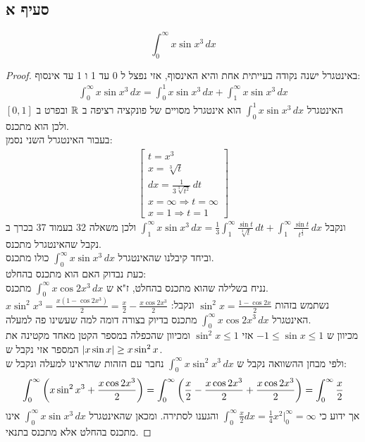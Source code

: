 \documentclass{article}
\begin{document}
	\subsection*{סעיף א}
	\[
	\int_0^\infty x \sin x^3 \, dx
	\]
	\begin{proof}
		באינטגרל ישנה נקודה בעייתית אחת והיא האינסוף, אזי נפצל ל 0 עד 1 ו 1 עד אינסוף:
		\begin{align*}
			\int_0^\infty x \sin x^3 \, dx = \int_0^1 x \sin x^3 \, dx + \int_1^\infty x \sin x^3 \, dx
		\end{align*}
		האינטגרל $\int_0^1 x \sin x^3 \, dx$ הוא אינטגרל מסויים של פונקציה רציפה ב $\mathbb{R}$ ובפרט ב $[0,1]$ ולכן הוא מתכנס. \\
		בעבור האינטגרל השני נסמן:
		\begin{align*}
		\begin{bmatrix}
			t = x^3 \\
			x = \sqrt[3]{t} \\
			dx = \frac{1}{3 \sqrt[3]{t^2}} \, dt \\
			x = \infty \Rightarrow t = \infty \\
			x = 1 \Rightarrow t = 1
		\end{bmatrix}
	\end{align*}
	ונקבל $\int_1^\infty x \sin x^3 \, dx =
	\frac{1}{3} \int_1^\infty \frac{\sin t}{\sqrt[3]{t}} \, dt +
	\int_1^\infty \frac{\sin t}{t^{\frac{1}{3}}}\, dx$
		ולכן משאלה 32 בעמוד 37 בכרך ב נקבל שהאינטגרל מתכנס. \\
		וביחד קיבלנו שהאינטגרל $\int_0^\infty x \sin x^3 \, dx$ כולו מתכנס. \\
		כעת נבדוק האם הוא מתכנס בהחלט: \\
		נניח בשלילה שהוא מתכנס בהחלט, ז"א ש $\int_0^\infty x \cos 2x^3 \, dx$ מתכנס. \\
		נשתמש בזהות $\sin^2 x = \frac{1 - \cos 2x}{2}$ ונקבל: $x \sin^2 x^3 = \frac{x(1 - \cos 2x^3)}{2}= \frac{x}{2} - \frac{x \cos 2x^3}{2}$
		האינטגרל $\int_0^\infty x \cos 2x^3 \, dx$ מתכנס בדיוק בצורה דומה למה שעשינו פה למעלה. \\
		מכיוון ש $-1 \leq \sin x \leq 1$ אזי $\sin^2 x \leq 1$ ומכיוון שהכפלה במספר הקטן מאחד מקטינה את המספר אזי נקבל ש $\left| x \sin x \right| \geq x \sin^2 x$. \\
		ולפי מבחן ההשוואה נקבל ש $\int_0^\infty x \sin^2 x^3 \, dx$ נחבר עם הזהות שהראינו למעלה ונקבל ש:
		\[
		\int_0^\infty \left( x \sin^2 x^3 + \frac{x \cos 2x^3}{2} \right) =
		\int_0^\infty \left( \frac{x}{2} - \frac{x \cos 2x^3}{2} + \frac{x \cos 2x^3}{2} \right) =
		\int_0^\infty \frac{x}{2}
		\]
		אך ידוע כי $\int_0^\infty \frac{x}{2} dx = \frac{1}{4} x^2 \big|^\infty_0 = \infty$ והגענו לסתירה.
		ומכאן שהאינטגרל $\int_0^\infty x \sin x^3 \, dx$ אינו מתכנס בהחלט אלא מתכנס בתנאי.
	\end{proof}
\end{document}
